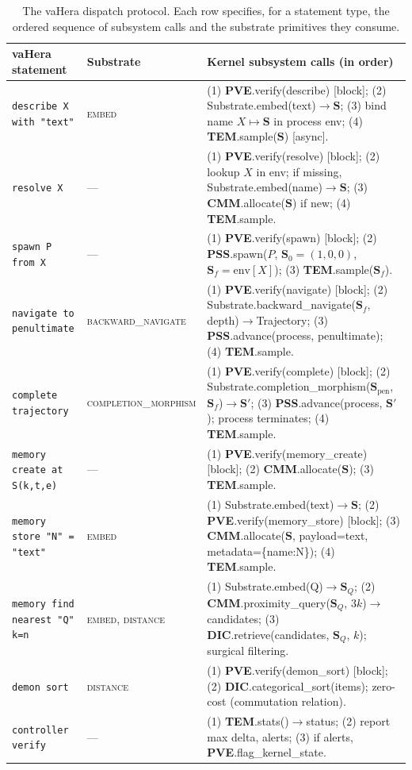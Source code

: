 \documentclass[11pt,twocolumn,a4paper]{article}
\newcommand{\Scoord}{\mathbf{S}}
\begin{document}
\begin{table}[!htbp]
\centering
\caption{The vaHera dispatch protocol. Each row specifies, for a statement type, the ordered sequence of subsystem calls and the substrate primitives they consume.}
\label{tab:dispatch}
\small
\begin{tabularx}{\textwidth}{l l X}
\toprule
\textbf{vaHera statement} & \textbf{Substrate} & \textbf{Kernel subsystem calls (in order)} \\
\midrule
\texttt{describe X with "text"}
  & \textsc{embed}
  & (1) \textbf{PVE}.verify(describe) [block]; (2) Substrate.embed(text)$\to \Scoord$; (3) bind name $X \mapsto \Scoord$ in process env; (4) \textbf{TEM}.sample($\Scoord$) [async]. \\
\addlinespace
\texttt{resolve X}
  & ---
  & (1) \textbf{PVE}.verify(resolve) [block]; (2) lookup $X$ in env; if missing, Substrate.embed(name)$\to \Scoord$; (3) \textbf{CMM}.allocate($\Scoord$) if new; (4) \textbf{TEM}.sample. \\
\addlinespace
\texttt{spawn P from X}
  & ---
  & (1) \textbf{PVE}.verify(spawn) [block]; (2) \textbf{PSS}.spawn($P$, $\Scoord_0 = (1,0,0)$, $\Scoord_f = \text{env}[X]$); (3) \textbf{TEM}.sample($\Scoord_f$). \\
\addlinespace
\texttt{navigate to penultimate}
  & \textsc{backward\_navigate}
  & (1) \textbf{PVE}.verify(navigate) [block]; (2) Substrate.backward\_navigate($\Scoord_f$, depth)$\to$Trajectory; (3) \textbf{PSS}.advance(process, penultimate); (4) \textbf{TEM}.sample. \\
\addlinespace
\texttt{complete trajectory}
  & \textsc{completion\_morphism}
  & (1) \textbf{PVE}.verify(complete) [block]; (2) Substrate.completion\_morphism($\Scoord_{\text{pen}}$, $\Scoord_f$)$\to \Scoord'$; (3) \textbf{PSS}.advance(process, $\Scoord'$); process terminates; (4) \textbf{TEM}.sample. \\
\addlinespace
\texttt{memory create at S(k,t,e)}
  & ---
  & (1) \textbf{PVE}.verify(memory\_create) [block]; (2) \textbf{CMM}.allocate($\Scoord$); (3) \textbf{TEM}.sample. \\
\addlinespace
\texttt{memory store "N" = "text"}
  & \textsc{embed}
  & (1) Substrate.embed(text)$\to \Scoord$; (2) \textbf{PVE}.verify(memory\_store) [block]; (3) \textbf{CMM}.allocate($\Scoord$, payload=text, metadata=\{name:N\}); (4) \textbf{TEM}.sample. \\
\addlinespace
\texttt{memory find nearest "Q" k=n}
  & \textsc{embed}, \textsc{distance}
  & (1) Substrate.embed(Q)$\to \Scoord_Q$; (2) \textbf{CMM}.proximity\_query($\Scoord_Q$, $3k$)$\to$candidates; (3) \textbf{DIC}.retrieve(candidates, $\Scoord_Q$, $k$); surgical filtering. \\
\addlinespace
\texttt{demon sort}
  & \textsc{distance}
  & (1) \textbf{PVE}.verify(demon\_sort) [block]; (2) \textbf{DIC}.categorical\_sort(items); zero-cost (commutation relation). \\
\addlinespace
\texttt{controller verify}
  & ---
  & (1) \textbf{TEM}.stats()$\to$status; (2) report max delta, alerts; (3) if alerts, \textbf{PVE}.flag\_kernel\_state. \\
\bottomrule
\end{tabularx}
\end{table}
\end{document}
